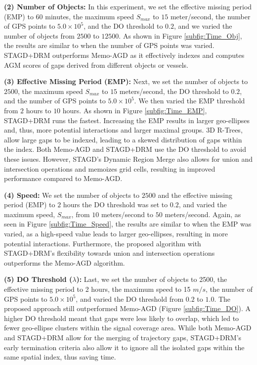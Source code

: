 \documentclass[acmsmall]{acmart}
\begin{document}
\textbf{(2) Number of Objects:} In this experiment, we set the effective missing period (EMP) to 60 minutes, the maximum speed $S_{max}$ to $15$ meter/second, the number of GPS points to $5.0 \times 10^{5}$, and the DO threshold to $0.2$, and we varied the number of objects from $2500$ to $12500$. As shown in Figure \ref{subfig:Time_Obj}, the results are similar to when the number of GPS points was varied. STAGD+DRM outperforms Memo-AGD as it effectively indexes and computes AGM scores of gaps derived from different objects or vessels. 

\textbf{(3) Effective Missing Period (EMP):} Next, we set the number of objects to $2500$, the maximum speed $S_{max}$ to $15$ meters/second, the DO threshold to $0.2$, and the number of GPS points to $5.0 \times 10^{5}$. We then varied the EMP threshold from $2$ hours to $10$ hours. As shown in Figure \ref{subfig:Time_EMP}, STAGD+DRM runs the fastest. Increasing the EMP results in larger geo-ellipses and, thus, more potential interactions and larger maximal groups. 3D R-Trees, allow large gaps to be indexed, leading to a skewed distribution of gaps within the index. Both Memo-AGD and STAGD+DRM use the DO threshold to avoid these issues. However, STAGD's Dynamic Region Merge also allows for union and intersection operations and memoizes grid cells, resulting in improved performance compared to Memo-AGD.

\textbf{(4) Speed:} We set the number of objects to $2500$ and the effective missing period (EMP) to $2$ hours the DO threshold was set to $0.2$, and varied the maximum speed, $S_{max}$, from $10$ meters/second to $50$ meters/second. Again, as seen in Figure \ref{subfig:Time_Speed}, the results are similar to when the EMP was varied, as a high-speed value leads to larger geo-ellipses, resulting in more potential interactions. Furthermore, the proposed algorithm with STAGD+DRM's flexibility towards union and intersection operations outperforms the Memo-AGD algorithm.

\textbf{(5) DO Threshold ($\lambda$):} Last, we set the number of objects to 2500, the effective missing period to 2 hours, the maximum speed to 15 $m/s$, the number of GPS points to $5.0 \times 10^{5}$, and varied the DO threshold from $0.2$ to $1.0$. The proposed approach still outperformed Memo-AGD (Figure \ref{subfig:Time_DO}). A higher DO threshold meant that gaps were less likely to overlap, which led to fewer geo-ellipse clusters within the signal coverage area. While both Memo-AGD and STAGD+DRM allow for the merging of trajectory gaps, STAGD+DRM's early termination criteria also allow it to ignore all the isolated gaps within the same spatial index, thus saving time.
\end{document}
